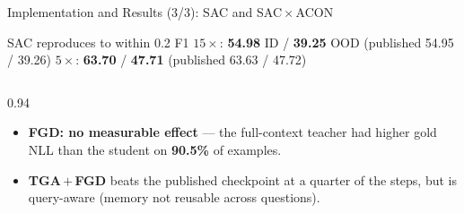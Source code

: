 \documentclass[aspectratio=169,10pt]{beamer}
\begin{document}
\begin{frame}{Implementation and Results (3/3): SAC and SAC\,$\times$\,ACON}
\begin{block}{SAC reproduces to within 0.2 F1}
\footnotesize
$15\times$: \textbf{54.98} ID / \textbf{39.25} OOD (published 54.95 / 39.26)
\qquad
$5\times$: \textbf{63.70} / \textbf{47.71} (published 63.63 / 47.72)
\end{block}
\centering
\scriptsize
\renewcommand{\arraystretch}{1.15}
\setlength{\tabcolsep}{4.5pt}

\vspace{0.25cm}
\begin{columns}
\begin{column}{0.94\textwidth}
\footnotesize
\begin{itemize}
  \item \textbf{FGD: no measurable effect} --- the full-context teacher had
        higher gold NLL than the student on \textbf{90.5\%} of examples.
  \item \textbf{TGA\,$+$\,FGD} beats the published checkpoint at a quarter of
        the steps, but is query-aware (memory not reusable across questions).
\end{itemize}
\end{column}
\end{columns}
\end{frame}

\end{document}
